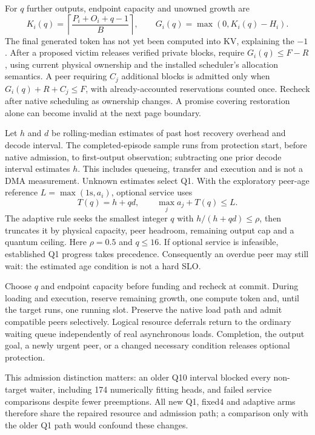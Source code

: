 \documentclass[10pt]{article}
\begin{document}
For $q$ further outputs, endpoint capacity and unowned growth are
\begin{equation}
K_i(q)=\left\lceil\frac{P_i+O_i+q-1}{B}\right\rceil,
\qquad G_i(q)=\max(0,K_i(q)-H_i).
\end{equation}
The final generated token has not yet been computed into KV, explaining the $-1$. After a proposed victim releases verified private blocks, require $G_i(q)\le F-R$, using current physical ownership and the installed scheduler's allocation semantics. A peer requiring $C_j$ additional blocks is admitted only when $G_i(q)+R+C_j\le F$, with already-accounted reservations counted once. Recheck after native scheduling as ownership changes. A promise covering restoration alone can become invalid at the next page boundary.

Let $h$ and $d$ be rolling-median estimates of past host recovery overhead and decode interval. The completed-episode sample runs from protection start, before native admission, to first-output observation; subtracting one prior decode interval estimates $h$. This includes queueing, transfer and execution and is not a DMA measurement. Unknown estimates select Q1. With the exploratory peer-age reference $L=\max(1\mathrm{s},a_i)$, optional service uses
\begin{equation}
T(q)=h+qd,\qquad \max_j a_j+T(q)\le L.
\end{equation}
The adaptive rule seeks the smallest integer $q$ with $h/(h+qd)\le\rho$, then truncates it by physical capacity, peer headroom, remaining output cap and a quantum ceiling. Here $\rho=0.5$ and $q\le16$. If optional service is infeasible, established Q1 progress takes precedence. Consequently an overdue peer may still wait: the estimated age condition is not a hard SLO.

Choose $q$ and endpoint capacity before funding and recheck at commit. During loading and execution, reserve remaining growth, one compute token and, until the target runs, one running slot. Preserve the native load path and admit compatible peers selectively. Logical resource deferrals return to the ordinary waiting queue independently of real asynchronous loads. Completion, the output goal, a newly urgent peer, or a changed necessary condition releases optional protection.

This admission distinction matters: an older Q10 interval blocked every non-target waiter, including 174 numerically fitting heads, and failed service comparisons despite fewer preemptions. All new Q1, fixed4 and adaptive arms therefore share the repaired resource and admission path; a comparison only with the older Q1 path would confound these changes.
\end{document}
